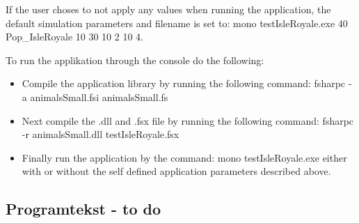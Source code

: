 \documentclass[a4paper]{report}
\begin{document}
If the user choses to not apply any values when running the application, the default simulation parameters and filename is set to: mono testIsleRoyale.exe 40 Pop\_IsleRoyale 10 30 10 2 10 4.

To run the applikation through the console do the following:

\begin{itemize}
\item Compile the application library by running the following command: fsharpc -a animalsSmall.fsi animalsSmall.fs
\item Next compile the .dll and .fsx file by running the following command: fsharpc -r animalsSmall.dll testIsleRoyale.fsx
\item Finally run the application by the command: mono testIsleRoyale.exe either with or without the self defined application parameters described above.
\end{itemize}

\subsection*{Programtekst - to do}
\end{document}
